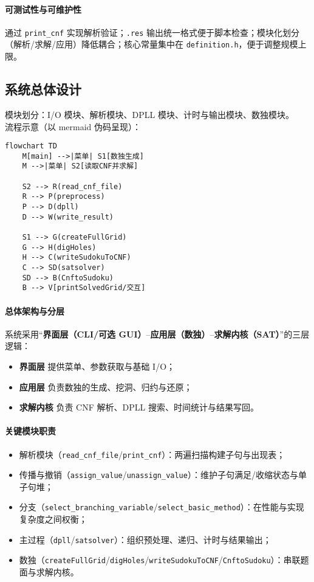 \documentclass[UTF8]{ctexart}
\begin{document}
\paragraph{可测试性与可维护性} 通过 \texttt{print\_cnf} 实现解析验证；\texttt{.res} 输出统一格式便于脚本检查；模块化划分（解析/求解/应用）降低耦合；核心常量集中在 \texttt{definition.h}，便于调整规模上限。

\subsection{系统总体设计}
模块划分：I/O 模块、解析模块、DPLL 模块、计时与输出模块、数独模块。\\
流程示意（以 mermaid 伪码呈现）：
\begin{lstlisting}[language={}]
flowchart TD
    M[main] -->|菜单| S1[数独生成]
    M -->|菜单| S2[读取CNF并求解]

    S2 --> R(read_cnf_file)
    R --> P(preprocess)
    P --> D(dpll)
    D --> W(write_result)

    S1 --> G(createFullGrid)
    G --> H(digHoles)
    H --> C(writeSudokuToCNF)
    C --> SD(satsolver)
    SD --> B(CnftoSudoku)
    B --> V[printSolvedGrid/交互]
\end{lstlisting}

\paragraph{总体架构与分层} 系统采用“\textbf{界面层（CLI/可选 GUI）}--\textbf{应用层（数独）}--\textbf{求解内核（SAT）}”的三层逻辑：
\begin{itemize}
  \item \textbf{界面层} 提供菜单、参数获取与基础 I/O；
  \item \textbf{应用层} 负责数独的生成、挖洞、归约与还原；
  \item \textbf{求解内核} 负责 CNF 解析、DPLL 搜索、时间统计与结果写回。
\end{itemize}

\paragraph{关键模块职责}
\begin{itemize}
  \item 解析模块（\texttt{read\_cnf\_file}/\texttt{print\_cnf}）：两遍扫描构建子句与出现表；
  \item 传播与撤销（\texttt{assign\_value}/\texttt{unassign\_value}）：维护子句满足/收缩状态与单子句堆；
  \item 分支（\texttt{select\_branching\_variable}/\texttt{select\_basic\_method}）：在性能与实现复杂度之间权衡；
  \item 主过程（\texttt{dpll}/\texttt{satsolver}）：组织预处理、递归、计时与结果输出；
  \item 数独（\texttt{createFullGrid}/\texttt{digHoles}/\texttt{writeSudokuToCNF}/\texttt{CnftoSudoku}）：串联题面与求解内核。
\end{itemize}
\end{document}
